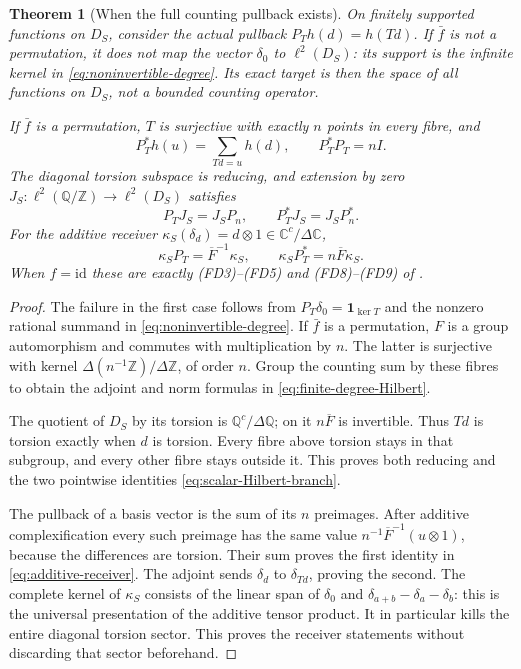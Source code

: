 \documentclass[11pt,a4paper]{article}
\newtheorem{theorem}{Theorem}[section]
\theoremstyle{definition}\newtheorem{definition}[theorem]{Definition}
\newcommand{\Z}{\mathbb Z}\newcommand{\Q}{\mathbb Q}
\newcommand{\C}{\mathbb C}\newcommand{\R}{\mathbb R}
\begin{document}
\begin{theorem}[When the full counting pullback exists]
\label{thm:counting-action}
On finitely supported functions on $D_S$, consider the actual
pullback $P_T h(d)=h(Td)$. If $\bar f$ is not a permutation, it does
not map the vector $\delta_0$ to $\ell^2(D_S)$: its support is the
infinite kernel in \eqref{eq:noninvertible-degree}. Its exact target
is then the space of all functions on $D_S$, not a bounded counting
operator.

If $\bar f$ is a permutation, $T$ is surjective with exactly $n$
points in every fibre, and
\[
 P_T^*h(u)=\sum_{Td=u}h(d),\qquad P_T^*P_T=nI.
 \tag{SE25}\label{eq:finite-degree-Hilbert}
\]
The diagonal torsion subspace is reducing, and extension by zero
$J_S:\ell^2(\Q/\Z)\to\ell^2(D_S)$ satisfies
\[
 P_TJ_S=J_SP_n,\qquad P_T^*J_S=J_SP_n^*.
 \tag{SE26}\label{eq:scalar-Hilbert-branch}
\]
For the additive receiver
$\kappa_S(\delta_d)=d\otimes1\in\C^c/\Delta\C$,
\[
 \kappa_SP_T=\overline F^{-1}\kappa_S,
 \qquad \kappa_SP_T^*=n\overline F\kappa_S.
 \tag{SE27}\label{eq:additive-receiver}
\]
When $f=\mathrm{id}$ these are exactly (FD3)--(FD5) and (FD8)--(FD9)
of .
\end{theorem}
\begin{proof}
The failure in the first case follows from
$P_T\delta_0=\mathbf1_{\ker T}$ and the nonzero rational summand in
\eqref{eq:noninvertible-degree}. If $\bar f$ is a permutation, $F$
is a group automorphism and commutes with multiplication by $n$.
The latter is surjective with kernel $\Delta(n^{-1}\Z)/\Delta\Z$,
of order $n$. Group the counting sum by these fibres to obtain the
adjoint and norm formulas in \eqref{eq:finite-degree-Hilbert}.

The quotient of $D_S$ by its torsion is $\Q^c/\Delta\Q$; on it
$n\overline F$ is invertible. Thus $Td$ is torsion exactly when $d$
is torsion. Every fibre above torsion stays in that subgroup, and
every other fibre stays outside it. This proves both reducing and
the two pointwise identities \eqref{eq:scalar-Hilbert-branch}.

The pullback of a basis vector is the sum of its $n$ preimages.
After additive complexification every such preimage has the same
value $n^{-1}\overline F^{-1}(u\otimes1)$, because the differences
are torsion. Their sum proves the first identity in
\eqref{eq:additive-receiver}. The adjoint sends $\delta_d$ to
$\delta_{Td}$, proving the second. The complete kernel of
$\kappa_S$ consists of the linear span of
$\delta_0$ and $\delta_{a+b}-\delta_a-\delta_b$: this is the
universal presentation of the additive tensor product. It in
particular kills the entire diagonal torsion sector. This proves
the receiver statements without discarding that sector beforehand.
\end{proof}
\end{document}
